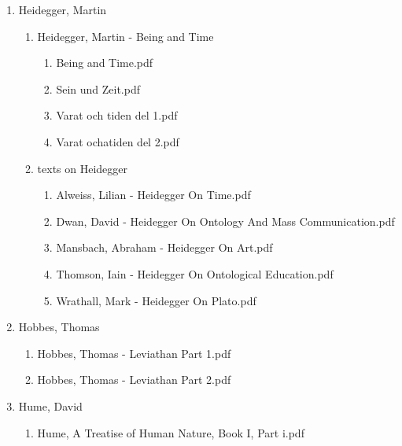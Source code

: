 \documentclass[11pt]{article}
\begin{document}
\begin{enumerate}
\begin{enumerate}
\begin{enumerate}
\begin{enumerate}
\begin{enumerate}
\item Heidegger, Martin
\label{sec-1-1-1-1-7-3-14-37}
\begin{enumerate}
\item Heidegger, Martin - Being and Time
\label{sec-1-1-1-1-7-3-14-37-1}
\begin{enumerate}
\item Being and Time.pdf
\label{sec-1-1-1-1-7-3-14-37-1-1}

\item Sein und Zeit.pdf
\label{sec-1-1-1-1-7-3-14-37-1-2}

\item Varat och tiden del 1.pdf
\label{sec-1-1-1-1-7-3-14-37-1-3}

\item Varat ochatiden del 2.pdf
\label{sec-1-1-1-1-7-3-14-37-1-4}
\end{enumerate}

\item texts on Heidegger
\label{sec-1-1-1-1-7-3-14-37-2}
\begin{enumerate}
\item Alweiss, Lilian - Heidegger On Time.pdf
\label{sec-1-1-1-1-7-3-14-37-2-1}

\item Dwan, David - Heidegger On Ontology And Mass Communication.pdf
\label{sec-1-1-1-1-7-3-14-37-2-2}

\item Mansbach, Abraham - Heidegger On Art.pdf
\label{sec-1-1-1-1-7-3-14-37-2-3}

\item Thomson, Iain - Heidegger On Ontological Education.pdf
\label{sec-1-1-1-1-7-3-14-37-2-4}

\item Wrathall, Mark - Heidegger On Plato.pdf
\label{sec-1-1-1-1-7-3-14-37-2-5}
\end{enumerate}
\end{enumerate}

\item Hobbes, Thomas
\label{sec-1-1-1-1-7-3-14-38}
\begin{enumerate}
\item Hobbes, Thomas - Leviathan Part 1.pdf
\label{sec-1-1-1-1-7-3-14-38-1}

\item Hobbes, Thomas - Leviathan Part 2.pdf
\label{sec-1-1-1-1-7-3-14-38-2}
\end{enumerate}

\item Hume, David
\label{sec-1-1-1-1-7-3-14-39}
\begin{enumerate}
\item Hume, A Treatise of Human Nature, Book I, Part i.pdf
\label{sec-1-1-1-1-7-3-14-39-1}


\end{enumerate}
\end{enumerate}
\end{enumerate}
\end{enumerate}
\end{enumerate}
\end{enumerate}
\end{document}

